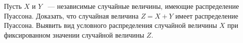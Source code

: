 \begin{comment}
\begin{problem}
\begin{enumerate}
\item Имеется монетка (несимметричная). Несимметричность монетки заключается в том, что либо орел выпадает в два раза чаще решки; 
либо наоборот (априорно (до проведения опытов) оба варианта считаются равновероятными). Монетку бросили $10$ раз. Орел выпал $7$ раз. 
Определите апостериорную вероятность того, что орел выпадает в два раза чаще решки (апостериорная вероятность считается с учетом 
проведенных опытов (иначе говоря, это просто условная вероятность)). 

\item Определите апостериорную вероятность того, что орел выпадает не менее чем в два раза чаще решки. Если несимметричность 
монетки заключается в том, что либо орел выпадает не менее чем в два раза чаще решки; либо наоборот (априорно оба варианта считаются 
равновероятными). 
\end{enumerate}
\end{problem}
\end{comment}

\begin{problem}
Пусть $X$ и $Y$ ~--– независимые случайные величины,  имеющие распределение Пуассона. 
Доказать, что случайная величина $Z = X + Y$ имеет распределение Пуассона. 
Выявить вид условного распределения случайной величины $X$ при фиксированном значении случайной величины $Z$.
\end{problem}
